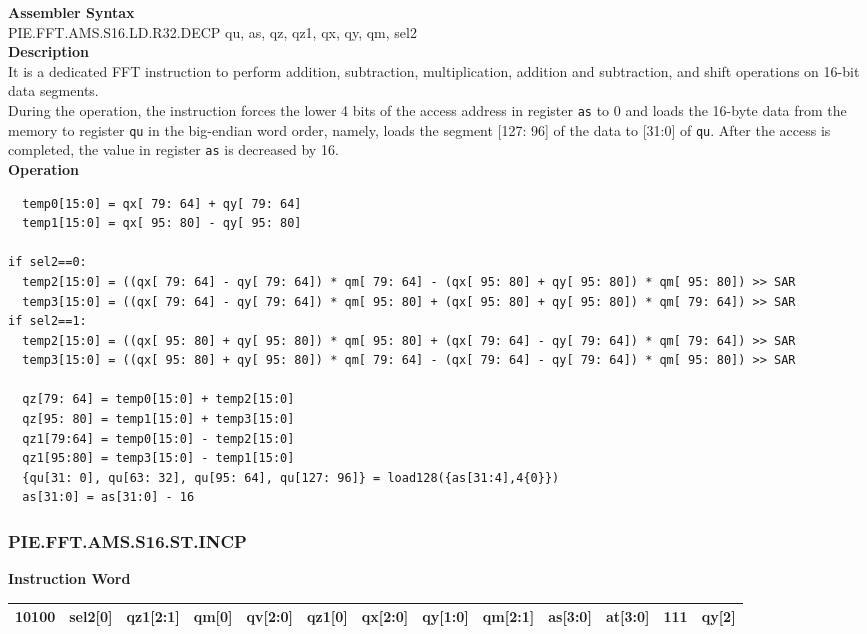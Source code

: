 \textbf{Assembler Syntax} \\
PIE.FFT.AMS.S16.LD.R32.DECP qu, as, qz, qz1, qx, qy, qm, sel2 \\
\textbf{Description} \\
It is a dedicated FFT instruction to perform addition, subtraction, multiplication, addition and subtraction, and shift operations on 16-bit data segments.\\
During the operation, the instruction forces the lower 4 bits of the access address in register \lstinline{as} to 0 and loads the 16-byte data from the memory to register \lstinline{qu} in the big-endian word order, namely, loads the segment [127: 96] of the data to [31:0] of \lstinline{qu}. After the access is completed, the value in register \lstinline{as} is decreased by 16.\\
\textbf{Operation}
\begin{lstlisting}
  temp0[15:0] = qx[ 79: 64] + qy[ 79: 64]
  temp1[15:0] = qx[ 95: 80] - qy[ 95: 80]

if sel2==0:
  temp2[15:0] = ((qx[ 79: 64] - qy[ 79: 64]) * qm[ 79: 64] - (qx[ 95: 80] + qy[ 95: 80]) * qm[ 95: 80]) >> SAR
  temp3[15:0] = ((qx[ 79: 64] - qy[ 79: 64]) * qm[ 95: 80] + (qx[ 95: 80] + qy[ 95: 80]) * qm[ 79: 64]) >> SAR
if sel2==1:
  temp2[15:0] = ((qx[ 95: 80] + qy[ 95: 80]) * qm[ 95: 80] + (qx[ 79: 64] - qy[ 79: 64]) * qm[ 79: 64]) >> SAR
  temp3[15:0] = ((qx[ 95: 80] + qy[ 95: 80]) * qm[ 79: 64] - (qx[ 79: 64] - qy[ 79: 64]) * qm[ 95: 80]) >> SAR

  qz[79: 64] = temp0[15:0] + temp2[15:0]
  qz[95: 80] = temp1[15:0] + temp3[15:0]
  qz1[79:64] = temp0[15:0] - temp2[15:0]
  qz1[95:80] = temp3[15:0] - temp1[15:0]
  {qu[31: 0], qu[63: 32], qu[95: 64], qu[127: 96]} = load128({as[31:4],4{0}})
  as[31:0] = as[31:0] - 16
\end{lstlisting}

\newpage
\subsubsection{PIE.FFT.AMS.S16.ST.INCP}\label{instruction:PIEFFTAMSS16STINCP}
\setlength\tabcolsep{6pt}
\textbf{Instruction Word} \\
\begin{tabular}{|c|c|c|c|c|c|c|c|c|c|c|c|c|}
	\hline
	10100 & sel2[0] & qz1[2:1] & qm[0] & qv[2:0] & qz1[0] & qx[2:0] & qy[1:0] & qm[2:1] & as[3:0] & at[3:0] & 111 & qy[2] \\
	\hline
\end{tabular}

